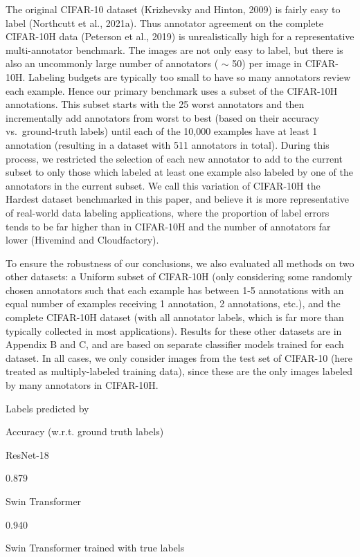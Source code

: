 \documentclass[
]{article}
\begin{document}
The original CIFAR-10 dataset (Krizhevsky and Hinton, 2009) is fairly
easy to label (Northcutt et al., 2021a). Thus annotator agreement on the
complete CIFAR-10H data (Peterson et al., 2019) is unrealistically high
for a representative multi-annotator benchmark. The images are not only
easy to label, but there is also an uncommonly large number of
annotators ( \(\sim\) 50) per image in CIFAR-10H. Labeling budgets are
typically too small to have so many annotators review each example.
Hence our primary benchmark uses a subset of the CIFAR-10H annotations.
This subset starts with the 25 worst annotators and then incrementally
add annotators from worst to best (based on their accuracy
vs.~ground-truth labels) until each of the 10,000 examples have at least
1 annotation (resulting in a dataset with 511 annotators in total).
During this process, we restricted the selection of each new annotator
to add to the current subset to only those which labeled at least one
example also labeled by one of the annotators in the current subset. We
call this variation of CIFAR-10H the Hardest dataset benchmarked in this
paper, and believe it is more representative of real-world data labeling
applications, where the proportion of label errors tends to be far
higher than in CIFAR-10H and the number of annotators far lower
(Hivemind and Cloudfactory).

To ensure the robustness of our conclusions, we also evaluated all
methods on two other datasets: a Uniform subset of CIFAR-10H (only
considering some randomly chosen annotators such that each example has
between 1-5 annotations with an equal number of examples receiving 1
annotation, 2 annotations, etc.), and the complete CIFAR-10H dataset
(with all annotator labels, which is far more than typically collected
in most applications). Results for these other datasets are in Appendix
B and C, and are based on separate classifier models trained for each
dataset. In all cases, we only consider images from the test set of
CIFAR-10 (here treated as multiply-labeled training data), since these
are the only images labeled by many annotators in CIFAR-10H.

Labels predicted by

Accuracy (w.r.t. ground truth labels)

ResNet-18

0.879

Swin Transformer

0.940

Swin Transformer trained with true labels
\end{document}
